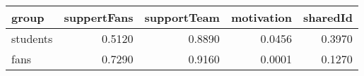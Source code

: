 \begin{tabular}{lrrrr}
  \hline
group & suppertFans & supportTeam & motivation & sharedId \\ 
  \hline
students & 0.5120 & 0.8890 & 0.0456 & 0.3970 \\ 
  fans & 0.7290 & 0.9160 & 0.0001 & 0.1270 \\ 
   \hline
\end{tabular}
